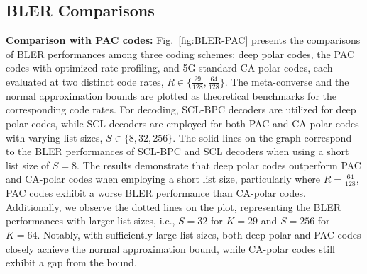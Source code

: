 \documentclass[conference]{IEEEtran}
\begin{document}
\subsection{BLER Comparisons}


{\bf Comparison with PAC codes:} Fig.~\ref{fig:BLER-PAC} presents the comparisons of BLER performances among three coding schemes: deep polar codes, the PAC codes with optimized rate-profiling, and 5G standard CA-polar codes, each evaluated at two distinct code rates, $R \in \{\frac{29}{128},\frac{64}{128}\}$. The meta-converse and the normal approximation bounds are plotted as theoretical benchmarks for the corresponding code rates. For decoding, SCL-BPC decoders are utilized for deep polar codes, while SCL decoders are employed for both PAC and CA-polar codes with varying list sizes, $S \in \{8,32,256\}$. The solid lines on the graph correspond to the BLER performances of SCL-BPC and SCL decoders when using a short list size of $S=8$. The results demonstrate that deep polar codes outperform PAC and CA-polar codes when employing a short list size, particularly where $R=\frac{64}{128}$, PAC codes exhibit a worse BLER performance than CA-polar codes. Additionally, we observe the dotted lines on the plot, representing the BLER performances with larger list sizes, i.e., $S=32$ for $K=29$ and $S=256$ for $K=64$. Notably, with sufficiently large list sizes, both deep polar and PAC codes closely achieve the normal approximation bound, while CA-polar codes still exhibit a gap from the bound.




\end{document}
